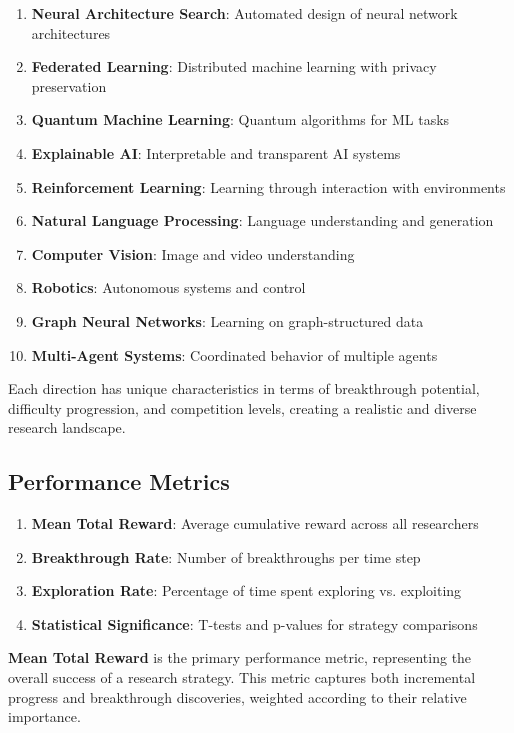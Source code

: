 \documentclass[letterpaper]{article}
\begin{document}
\begin{enumerate}
\item \textbf{Neural Architecture Search}: Automated design of neural network architectures
\item \textbf{Federated Learning}: Distributed machine learning with privacy preservation
\item \textbf{Quantum Machine Learning}: Quantum algorithms for ML tasks
\item \textbf{Explainable AI}: Interpretable and transparent AI systems
\item \textbf{Reinforcement Learning}: Learning through interaction with environments
\item \textbf{Natural Language Processing}: Language understanding and generation
\item \textbf{Computer Vision}: Image and video understanding
\item \textbf{Robotics}: Autonomous systems and control
\item \textbf{Graph Neural Networks}: Learning on graph-structured data
\item \textbf{Multi-Agent Systems}: Coordinated behavior of multiple agents
\end{enumerate}

Each direction has unique characteristics in terms of breakthrough potential, difficulty progression, and competition levels, creating a realistic and diverse research landscape.

\subsection{Performance Metrics}

\begin{enumerate}
\item \textbf{Mean Total Reward}: Average cumulative reward across all researchers
\item \textbf{Breakthrough Rate}: Number of breakthroughs per time step
\item \textbf{Exploration Rate}: Percentage of time spent exploring vs. exploiting
\item \textbf{Statistical Significance}: T-tests and p-values for strategy comparisons
\end{enumerate}

\textbf{Mean Total Reward} is the primary performance metric, representing the overall success of a research strategy. This metric captures both incremental progress and breakthrough discoveries, weighted according to their relative importance.
\end{document}

